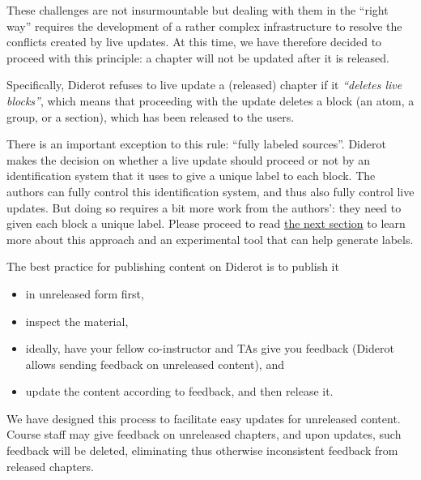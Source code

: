 \begin{gram}
These challenges are not insurmountable but dealing with them in the ``right way'' requires the development of a rather complex infrastructure to resolve the conflicts created by live updates.
%
At this time, we have therefore decided to proceed with this
principle: a chapter will not be updated after it is released.
%

Specifically, Diderot  refuses to live update a (released) chapter if it \emph{``deletes live blocks''}, which means that proceeding with the update deletes a block (an atom, a group, or a section), which has been released to the users.
%

%
There is an important exception to this rule: ``fully labeled sources''.
%
Diderot makes the decision on whether a live update should proceed or not by an identification system that it uses to give a unique label to each block.
%
The authors can fully control this identification system, and thus also fully control live updates.
%
But doing so requires a bit more work from the authors': they need to given each block a unique label.
%
Please proceed to read 
%
\href{sec:publish::full-labeling}{the next section}
%
to learn more about this approach and an experimental tool that can help generate labels.
\end{gram}


\begin{gram}
The best practice for publishing content on Diderot is to publish it 
\begin{itemize}
\item in unreleased form first, 
\item inspect the material,
\item ideally, have your fellow co-instructor and TAs give you feedback (Diderot allows sending feedback on unreleased content), and 
\item update the content according to feedback, and then release it. 
\end{itemize}

We have designed this process to facilitate easy updates for unreleased content.  Course staff may give feedback on unreleased chapters, and upon updates, such feedback will be deleted, eliminating thus otherwise inconsistent feedback from released chapters.
%
\end{gram}

